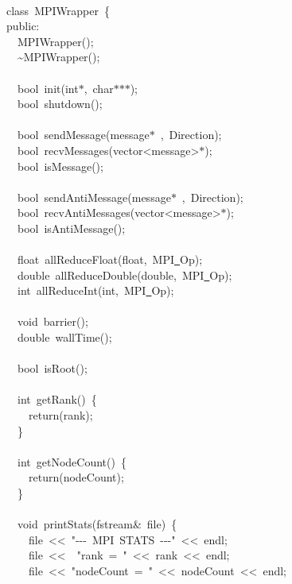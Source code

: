 {\ \\
class\ MPIWrapper\ \{\\
public:\\
\ \ MPIWrapper();\\
\ \ \textasciitilde MPIWrapper();\\
\ \\
\ \ bool\ init(int$\ast$,\ char$\ast$$\ast$$\ast$);\\
\ \ bool\ shutdown();\\
\ \\
\ \ bool\ sendMessage(message$\ast$\ ,\ Direction);\\
\ \ bool\ recvMessages(vector<{}message>{}$\ast$);\\
\ \ bool\ isMessage();\\
\ \\
\ \ bool\ sendAntiMessage(message$\ast$\ ,\ Direction);\\
\ \ bool\ recvAntiMessages(vector<{}message>{}$\ast$);\\
\ \ bool\ isAntiMessage();\\
\ \\
\ \ float\ allReduceFloat(float,\ MPI\underline\ Op);\\
\ \ double\ allReduceDouble(double,\ MPI\underline\ Op);\\
\ \ int\ allReduceInt(int,\ MPI\underline\ Op);\\
\ \\
\ \ void\ barrier();\\
\ \ double\ wallTime();\\
\ \\
\ \ bool\ isRoot();\\
\ \\
\ \ int\ getRank()\ \{\\
\ \ \ \ return(rank);\\
\ \ \}\\
\ \\
\ \ int\ getNodeCount()\ \{\\
\ \ \ \ return(nodeCount);\\
\ \ \}\\
\ \\
\ \ void\ printStats(fstream\&\ file)\ \{\\
\ \ \ \ file\ <{}<{}\ "{}-{}-{}-{}\ MPI\ STATS\ -{}-{}-{}"{}\ <{}<{}\ endl;\\
\ \ \ \ file\ <{}<{}\ \ "{}rank\ =\ "{}\ <{}<{}\ rank\ <{}<{}\ endl;\\
\ \ \ \ file\ <{}<{}\ "{}nodeCount\ =\ "{}\ <{}<{}\ nodeCount\ <{}<{}\ endl;\\
}
